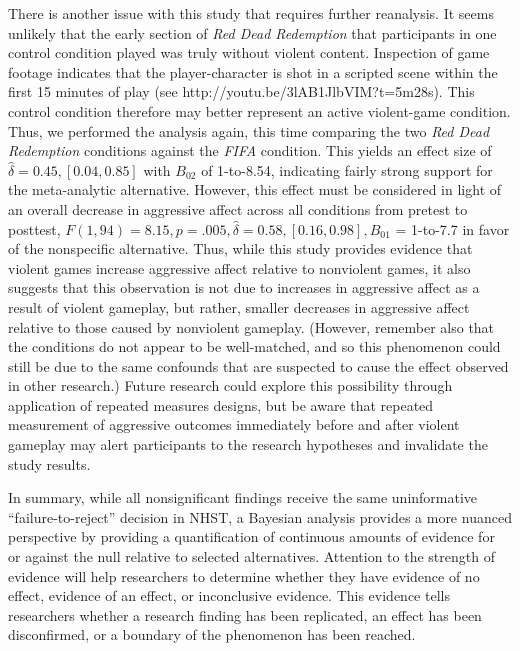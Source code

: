 \documentclass[man]{apa6}
\begin{document}
There is another issue with this study that requires further reanalysis. It seems unlikely that the early section of {\em Red Dead Redemption} that participants in one control condition played was truly without violent content. Inspection of game footage indicates that the player-character is shot in a scripted scene within the first 15 minutes of play (see http://youtu.be/3lAB1JlbVIM?t=5m28s). This control condition therefore may better represent an active violent-game condition.  Thus, we performed the analysis again, this time comparing the two {\em Red Dead Redemption} conditions against the {\em FIFA} condition. This yields an effect size of $\hat{\delta} = 0.45, [0.04, 0.85]$  with  $B_{02}$ of 1-to-8.54, indicating fairly strong support for the meta-analytic alternative. However, this effect must be considered in light of an overall decrease in aggressive affect across all conditions from pretest to posttest, $F(1, 94) = 8.15, p = .005, \hat{\delta} = 0.58, [0.16, 0.98], B_{01}$ = 1-to-7.7 in favor of the nonspecific alternative. Thus, while this study provides evidence that violent games increase aggressive affect relative to nonviolent games, it also suggests that this observation is not due to increases in aggressive affect as a result of violent gameplay, but rather, smaller decreases in aggressive affect relative to those caused by nonviolent gameplay. (However, remember also that the conditions do not appear to be well-matched, and so this phenomenon could still be due to the same confounds that are suspected to cause the effect observed in other research.) Future research could explore this possibility through application of repeated measures designs, but be aware that repeated measurement of aggressive outcomes immediately before and after violent gameplay may alert participants to the research hypotheses and invalidate the study results. 

In summary, while all nonsignificant findings receive the same uninformative ``failure-to-reject'' decision in NHST, a Bayesian analysis provides a more nuanced perspective by providing a quantification of continuous amounts of evidence for or against the null relative to selected alternatives. Attention to the strength of evidence will help researchers to determine whether they have evidence of no effect, evidence of an effect, or inconclusive evidence. This evidence tells researchers whether a research finding has been replicated, an effect has been disconfirmed, or a boundary of the phenomenon has been reached.
\end{document}
